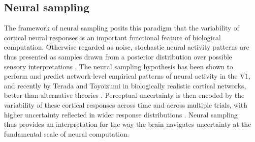 
\subsection{Neural sampling}\label{subsec:neur_sampling}
The framework of neural sampling posits this paradigm that the variability of cortical neural responses is an important functional feature of biological computation. Otherwise regarded as noise, stochastic neural activity patterns are thus presented as samples drawn from a posterior distribution over possible sensory interpretations \cite{orban_neural_2016, NIPS2002_a486cd07}. The neural sampling hypothesis has been shown to perform and predict network-level empirical patterns of neural activity in the V1, and recently by Terada and Toyoizumi in biologically realistic cortical networks, better than alternative theories \cite{NIPS2002_a486cd07, ujfalussy_sampling_2022, terada_chaotic_2024, orban_neural_2016}. Perceptual uncertainty is then encoded by the variability of these cortical responses across time and across multiple trials, with higher uncertainty reflected in wider response distributions \cite{NIPS2002_a486cd07, delacour_neural_1997, orban_neural_2016}. Neural sampling thus provides an interpretation for the way the brain navigates uncertainty at the fundamental scale of neural computation.

